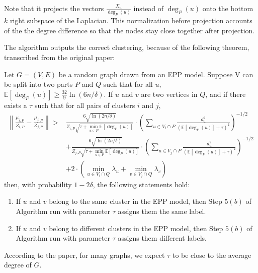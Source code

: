 {	Note that it projects the vectors $\frac{X_{u}}{\operatorname{deg}_{P}(u)}$ instead of $\operatorname{deg}_{P}(u)$ onto the bottom $k$ right subspace of the Laplacian. This normalization before projection accounts of the the degree difference so that the nodes stay close together after projection.
	
	The algorithm outputs the correct clustering, because of the following theorem, transcribed from the original paper:
	
	\begin{theorem}
		Let $G=(V, E)$ be a random graph drawn from an EPP model. Suppose V can be split into two parts $P$ and $Q$ such that for all $u$, $\mathbb{E}\left[\operatorname{deg}_{P}(u)\right] \geq \frac{32}{9} \ln (6 n / \delta)$. If $u$ and $v$ are two vertices in $Q$, and if there exists a $\tau$ such that for all pairs of clusters $i$ and $j$,
			$$
			\begin{aligned}
			\left\|\frac{\mu_{i, P}}{Z_{i, P}}-\frac{\mu_{j, P}}{Z_{j, P}}\right\|>& \frac{6 \sqrt{\ln (2 n / \delta)}}{Z_{i, P} \sqrt{\tau+\min _{u \in P} \mathbb{E}\left[\operatorname{deg}_{P}(u)\right]}} \cdot\left(\sum_{u \in V_{i} \cap P} \frac{d_{u}^{2}}{\left(\mathbb{E}\left[\operatorname{deg}_{P}(u)\right]+\tau\right)^{2}}\right)^{-1 / 2} \\
			&+\frac{6 \sqrt{\ln (2 n / \delta)}}{Z_{j, P} \sqrt{\tau+\min _{u \in P} \mathbb{E}\left[\operatorname{deg}_{P}(u)\right]}} \cdot\left(\sum_{u \in V_{j} \cap P} \frac{d_{u}^{2}}{\left(\mathbb{E}\left[\operatorname{deg}_{P}(u)\right]+\tau\right)^{2}}\right)^{-1 / 2} \\
			&+2 \cdot\left(\min _{u \in V_{i} \cap Q} \lambda_{u}+\min _{v \in V_{j} \cap Q} \lambda_{v}\right)
			\end{aligned}
			$$
		then, with probability $1-2 \delta$, the following statements hold:
		\begin{enumerate}
			\item If $u$ and $v$ belong to the same cluster in the EPP model, then Step $5(b)$ of Algorithm run with parameter $\tau$ assigns them the same label.
			\item If $u$ and $v$ belong to different clusters in the EPP model, then Step $5(b)$ of Algorithm run with parameter $\tau$ assigns them different labels.
		\end{enumerate}
	\end{theorem}
	
	According to the paper, for many graphs, we expect $\tau$ to be close to the average degree of $G$.
	
}
